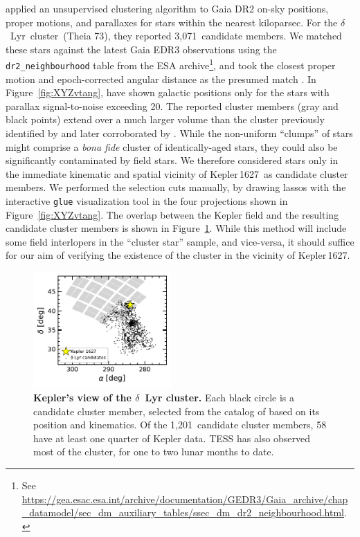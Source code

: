\documentclass[12pt,modern,twocolumn,tighten]{aastex63}
\newcommand{\cn}{$\delta$\ Lyr\ cluster} %
\newcommand{\sn}{Kepler\,1627} %
\newcommand{\nkinematic}{1{,}201} %
\newcommand{\noriginal}{3{,}071} %
\begin{document}
\citet{kounkel_untangling_2019} applied an unsupervised clustering
algorithm to Gaia DR2 on-sky positions, proper motions, and
parallaxes for stars within the nearest kiloparsec.  For the \cn\
(Theia 73), they reported \noriginal\ candidate members.  We
matched these stars against the latest Gaia EDR3 observations using
the \texttt{dr2\_neighbourhood} table from the ESA archive\footnote{See
\url{https://gea.esac.esa.int/archive/documentation/GEDR3/Gaia_archive/chap_datamodel/sec_dm_auxiliary_tables/ssec_dm_dr2_neighbourhood.html}.},
and took the closest proper motion and epoch-corrected angular
distance as the presumed match
\citep{gaia_collaboration_2021_edr3}.  In Figure~\ref{fig:XYZvtang},
have shown galactic positions only for the stars with
parallax signal-to-noise exceeding 20.  The reported cluster members
(gray and black points) extend over a much larger volume than the
cluster previously identified by \citet{stephenson_possible_1959} and
later corroborated by \citet{eggen_photometric_1968}.  While the
non-uniform ``clumps'' of stars might comprise a {\it bona fide}
cluster of identically-aged stars, they could also be significantly
contaminated by field stars.  We therefore considered stars only in
the immediate kinematic and spatial vicinity of \sn\ as candidate
cluster members.  We performed the selection cuts manually, by
drawing lassos with the interactive \texttt{glue} visualization tool
\citep{beaumont_2014_13866} in the four projections shown in
Figure~\ref{fig:XYZvtang}.  The overlap between the Kepler
field and the resulting candidate cluster members is shown in
Figure~\ref{fig:skychart}.  While this method will
include some field interlopers in the ``cluster star'' sample, and
vice-versa, it should suffice for our aim of verifying the existence
of the cluster in the vicinity of \sn.

\begin{figure}[t]
	\begin{center}
		\leavevmode
		\includegraphics[width=0.47\textwidth]{f1.pdf}
	\end{center}
	\vspace{-0.7cm}
	\caption{
		{\bf Kepler's view of the $\delta$~Lyr cluster.} Each black circle is a
		candidate cluster member, selected from the catalog of \citet{KounkelCovey2019} based on its
		position and kinematics.
		Of the \nkinematic\ candidate cluster members, 58 have at least one
		quarter of Kepler data.  TESS has also observed most of the
		cluster, for one to two lunar months to date.
		\label{fig:skychart}
	}
\end{figure}
\end{document}
